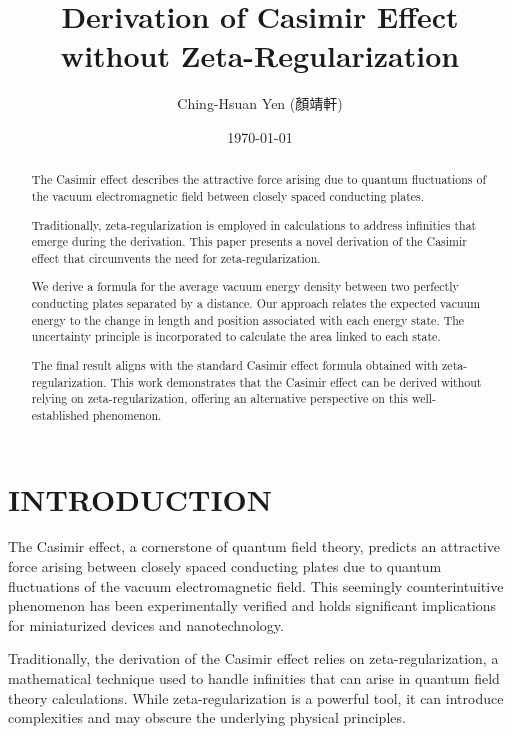 \documentclass[aip,apl,amsmath,amssymb,reprint]{revtex4-2}
\begin{document}
\title{Derivation of Casimir Effect without Zeta-Regularization}
\author{Ching-Hsuan Yen (顏靖軒)}
\date{\today}
\begin{abstract}
    The Casimir effect describes the attractive force arising due to quantum fluctuations of the vacuum electromagnetic field 
    between closely spaced conducting plates. 
    
    Traditionally, zeta-regularization is employed in calculations to address infinities that emerge during the derivation. 
    This paper presents a novel derivation of the Casimir effect that circumvents the need for zeta-regularization.
    
    We derive a formula for the average vacuum energy density between two perfectly conducting plates separated by a distance. 
    Our approach relates the expected vacuum energy to the change in length and position associated with each energy state. 
    The uncertainty principle is incorporated to calculate the area linked to each state. 
    
    The final result aligns with the standard Casimir effect formula obtained with zeta-regularization. 
    This work demonstrates that the Casimir effect can be derived without relying on zeta-regularization, 
    offering an alternative perspective on this well-established phenomenon.    
\end{abstract}
\maketitle


\section{INTRODUCTION}
The Casimir effect, a cornerstone of quantum field theory, predicts an attractive force arising between closely 
spaced conducting plates due to quantum fluctuations of the vacuum electromagnetic field. 
This seemingly counterintuitive phenomenon has been experimentally verified and holds significant 
implications for miniaturized devices and nanotechnology.

Traditionally, the derivation of the Casimir effect relies on zeta-regularization, 
a mathematical technique used to handle infinities that can arise in quantum field theory calculations. 
While zeta-regularization is a powerful tool, it can introduce complexities and may obscure the underlying physical principles.
\end{document}

